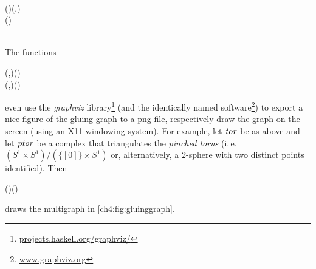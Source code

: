 \begin{hscode}\SaveRestoreHook
{}%
%
%
%
%
\>[B]{}\;\<[21]%
\>[21]{}\mathrel{=}{}\<[21E]%
\>[24]{}\;\<[E]%
\\[\blanklineskip]%
\>[B]{}\mathbin{::}(\;)\Rightarrow {}\;\to (,){}\<[E]%
\\
\>[B]{}\mathrel{=}(\mathbin{\&\&\&})\mathbin{\circ}\<[E]%
\\[\blanklineskip]%
\>[B]{}\mathbin{::}\;\to {}\<[E]%
\\
\>[B]{}\mathrel{=}\;\mathbin{\circ}\<[E]%
\ColumnHook
\end{hscode}\resethooks
The functions\begin{hscode}\SaveRestoreHook
{}%
%
%
\>[3]{}\mathbin{::}(,)\to {}\to {}\;(){}\<[E]%
\\
\>[3]{}\mathbin{::}(,)\to {}\;(){}\<[E]%
\ColumnHook
\end{hscode}\resethooks
even use the \emph{graphviz} library\footnote{%
\href{http://projects.haskell.org/graphviz/index.html}{%
\url{projects.haskell.org/graphviz/}}} (and the identically
named software\footnote{\href{http://www.graphviz.org/}{%
\url{www.graphviz.org}}})
to export a nice figure of the gluing graph to a png file,
respectively draw the graph on the screen (using an X11 windowing
system). For example, let \ensuremath{\Varid{tor}} be as above and let \ensuremath{\Varid{ptor}} be a complex that
triangulates the \emph{pinched torus} (i.\,e. $(S^1\times S^1)/
(\{[0]\}\times S^1)$ or, alternatively, a $2$-sphere with two
distinct points identified). Then\begin{hscode}\SaveRestoreHook
{}%
%
%
\>[4]{}\mathbin{\$}\mathbin{\$}(\mathbin{\#})(){}\<[E]%
\ColumnHook
\end{hscode}\resethooks
draws the multigraph in \cref{ch4:fig:gluinggraph}.

